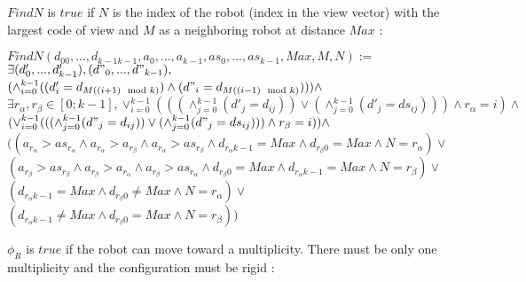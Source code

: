\documentclass{article}
\begin{document}
$FindN$ is $true$ if $N$ is the index of the robot (index in the view vector) with the largest code of view and $M$ as a neighboring robot at distance $Max$ :

\begin{center}

$FindN(d_{00}, ...,d_{k-1k-1}, a_{0}, ..., a_{k-1}, as_{0}, ..., as_{k-1}, Max, M, N):=$\\
$\exists (d'_{0}, ..., d'_{k-1}), (d"_{0}, ..., d"_{k-1}),$\\
$(\land_{i=0}^{k-1} ((d'_{i} = d_{M((i+1)\mod{k})}) \land (d"_{i} = d_{M((i-1)\mod{k})}))) \land$\\
$\exists r_{\alpha}, r_{\beta} \in [0; k-1], \lor_{i=0}^{k-1}(((\land_{j=0}^{k-1}(d'_{j} = d_{ij})) \lor
(\land_{j=0}^{k-1}(d'_{j} = ds_{ij}) ))
\land r_{\alpha} = i )\land$\\
$(\lor_{i=0}^{k-1}(((\land_{j=0}^{k-1}(d"_{j} = d_{ij})) \lor
(\land_{j=0}^{k-1}(d"_{j} = ds_{ij}) ))
\land r_{\beta} = i )) \land$\\
$((a_{r_\alpha} > as_{r_\alpha} \land a_{r_\alpha} > a_{r_\beta} \land a_{r_\alpha} > as_{r_\beta}
\land d_{r_{\alpha}k-1} = Max \land d_{r_{\beta}0} = Max
\land N = r_{\alpha}) \lor$\\
$(a_{r_\beta} > as_{r_\beta} \land a_{r_\beta} > a_{r_\alpha} \land a_{r_\beta} > as_{r_\alpha} 
\land d_{r_{\beta}0} = Max \land d_{r_{\alpha}k-1} = Max
\land N = r_{\beta}) \lor$\\
$(d_{r_{\alpha}k-1} = Max \land d_{r_{\beta}0} \not= Max \land N = r_{\alpha}) \lor$\\
$(d_{r_{\alpha}k-1} \not= Max \land d_{r_{\beta}0} = Max \land N = r_{\beta}))$
\end{center}

$\phi_R$ is $true$ if the robot can move toward a multiplicity. There must be only one multiplicity and the configuration must be rigid :
\end{document}
